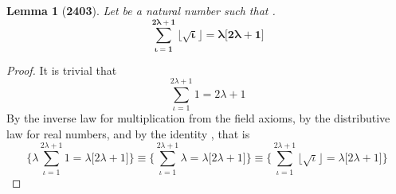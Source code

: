 \documentclass[preview]{standalone}
\newtheorem{lemma}{Lemma}
\begin{document}
\begin{lemma}[\textbf{2403}]
    Let \bm{$\iota$} be a natural number such that
    \bm{$\big \lfloor \sqrt \iota \big \rfloor = \lambda$}.
    \begin{equation*}
        \bm{
            \sum_{\iota=1}^{2 \lambda + 1} 
                    \big \lfloor \sqrt \iota \big \rfloor
                =
            \lambda \big[ 2 \lambda + 1 \big]
        }
    \end{equation*}
\end{lemma}

\begin{proof}
    It is trivial that
    \begin{equation*}
        \sum_{\iota=1}^{2 \lambda + 1} 
                1 = 2 \lambda + 1
    \end{equation*}
    By the inverse law for multiplication from the field axioms,
    by the distributive law for real numbers, and by the identity \bm{$\lambda$},
    that is
    \begin{equation*}
        \Bigg\{
            \lambda \sum_{\iota=1}^{2 \lambda + 1} 1 = \lambda \big[ 2 \lambda + 1 \big]
        \Bigg\}
                \equiv
        \Bigg\{
            \sum_{\iota=1}^{2 \lambda + 1} \lambda = \lambda \big[ 2 \lambda + 1 \big]
        \Bigg\}
            \equiv
        \Bigg\{
            \sum_{\iota=1}^{2 \lambda + 1} \big \lfloor \sqrt \iota \big \rfloor
                = 
            \lambda \big[ 2 \lambda + 1 \big]
        \Bigg\}
    \end{equation*}
\end{proof}
\end{document}
